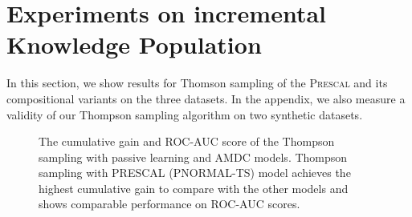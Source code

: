 
\section{Experiments on incremental\\ Knowledge Population}
\label{sec:exp2}

In this section, we show results for Thomson sampling of the \textsc{Prescal} and its compositional variants on the three datasets. In the appendix, we also measure a validity of our Thompson sampling algorithm on two synthetic datasets.

\begin{figure}[t]
	\centering

	\caption{\label{fig:vs_greedy} The cumulative gain and ROC-AUC score of the Thompson sampling with passive learning and  AMDC models. Thompson sampling with PRESCAL (\textsc{PNORMAL-TS}) model achieves the highest cumulative gain to compare with the other models and shows comparable performance on ROC-AUC scores.}
\end{figure}

